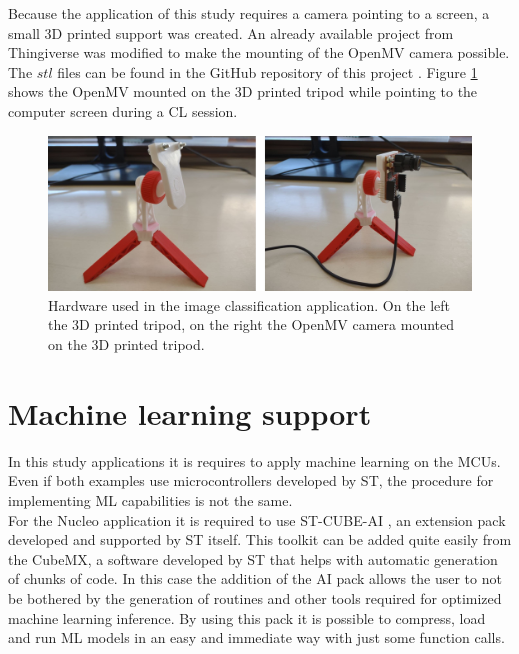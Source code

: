 \documentclass[12pt]{report}
\begin{document}
Because the application of this study requires a camera pointing to a screen, a small 3D printed support was created. An already available project from Thingiverse \cite{tripod_link} was modified to make the mounting of the OpenMV camera possible. The $stl$ files can be found in the GitHub repository of this project \cite{github_repo}. Figure \ref{fig:hardware_openmv} shows the OpenMV mounted on the 3D printed tripod while pointing to the computer screen during a CL session.\\

\begin{figure}[h!]
    \centering
    \includegraphics[width=120mm]{Figures/Chapter2/hardware_openmv.jpg} 
    \caption{Hardware used in the image classification application. On the left the 3D printed tripod, on the right the OpenMV camera mounted on the 3D printed tripod.}
    \label{fig:hardware_openmv}    
\end{figure}

\section{Machine learning support}
In this study applications it is requires to apply machine learning on the MCUs. Even if both examples use microcontrollers developed by ST, the procedure for implementing ML capabilities is not the same. \\
For the Nucleo application it is required to use ST-CUBE-AI \cite{stm_cube_ai}, an extension pack developed and supported by ST itself. This toolkit can be added quite easily from the CubeMX, a software developed by ST that helps with automatic generation of chunks of code. In this case the addition of the AI pack allows the user to not be bothered by the generation of routines and other tools required for optimized machine learning inference. By using this pack it is possible to compress, load and run ML models in an easy and immediate way with just some function calls.
\end{document}
